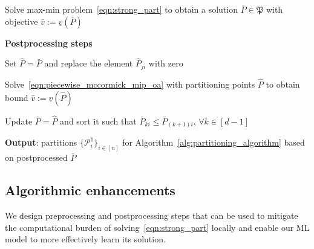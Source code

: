 \documentclass{article}
\DeclarePairedDelimiter\abs{\lvert}{\rvert}%
\begin{document}
\begin{algorithm}[t]
{\begin{algorithmic}[1]
\State Solve max-min problem~\eqref{eqn:strong_part} to obtain a solution $\bar{P} \in \mathfrak{P}$ with objective $\bar{v} := \underline{v}(\bar{P})$  \label{algo:maxmin}

\vspace*{0.15in}

\noindent
\textbf{Postprocessing steps} 


\vspace*{0.05in}

 \label{algo:postprocess_begin}


\State Set $\hat{P} = \bar{P}$ and replace the element $\hat{P}_{ji}$ with zero

\State Solve~\eqref{eqn:piecewise_mccormick_mip_oa} with partitioning points $\hat{P}$ to obtain bound $\hat{v} := \underline{v}(\hat{P})$


\State Update $\bar{P} = \hat{P}$ and sort it such that $\bar{P}_{ki} \leq \bar{P}_{(k+1)i}$, $\forall k \in [d-1]$

\EndIf


\EndFor

\EndFor

\vspace*{0.05in}
\State \textbf{Output}: partitions $\{\mathcal{P}^1_i\}_{i \in [n]}$ for Algorithm~\ref{alg:partitioning_algorithm} based on postprocessed $\bar{P}$ \label{algo:postprocess_end}


\end{algorithmic}
}
\end{algorithm}





\subsection{Algorithmic enhancements}

We design preprocessing and postprocessing steps that can be used to mitigate the computational burden of solving~\eqref{eqn:strong_part} locally and enable our ML model to more effectively learn its solution.
\end{document}
